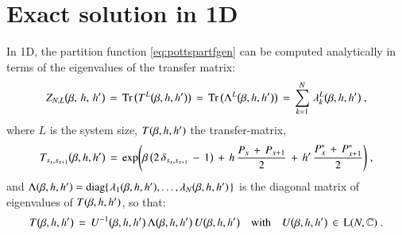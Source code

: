 \documentclass[epj]{webofc}
\let\originalleft\left
\let\originalright\right
\renewcommand{\left}{\mathopen{}\mathclose\bgroup\originalleft}
\renewcommand{\right}{\aftergroup\egroup\originalright}
\newcommand{\of}[1]{\left(#1\right)}
\newcommand{\sof}[1]{\bigl(\big.#1\big.\bigr)}
\newcommand{\cof}[1]{\left\{\right.#1\left.\right\}}
\newcommand{\diag}{\operatorname{diag}}
\newcommand{\sTrace}[1]{\operatorname{Tr}\big(#1\big)}
\newcommand{\op}[1]{\operatorname{#1}}
\renewcommand*\[{\begin{equation}}
\renewcommand*\]{\end{equation}}
\begin{document}
\section{Exact solution in 1D}\label{sec:exactsol}
In 1D, the partition function \eqref{eq:pottspartfgen} can be computed analytically in terms of the eigenvalues of the transfer matrix:
\[
Z_{N,L}\of{\beta,\,h,\,h'}\,=\,\sTrace{T^{L}\of{\beta,h,h'}}\,=\,\sTrace{\Lambda^{L}\of{\beta,h,h'}}\,=\,\sum\limits_{k=1}^{N}\,\lambda_{k}^{L}\of{\beta,h,h'}\ ,\label{eq:partf1d}
\]
where $L$ is the system size, $T\of{\beta,h,h'}$ the transfer-matrix,
\[
T_{s_{x},s_{x+1}}\of{\beta,h,h'}\,=\,\exp\of{\beta\,\sof{2\,\delta_{s_{x},s_{x+1}}\,-\,1}\,+\,h\,\frac{P_{x}\,+\,P_{x+1}}{2}\,+\,h'\,\frac{P^{*}_{x}\,+\,P^{*}_{x+1}}{2}}\ ,
\]
and $\Lambda\of{\beta,h,h'}=\diag\cof{\lambda_{1}\of{\beta,h,h'},\ldots,\lambda_{N}\of{\beta,h,h'}}$ is the diagonal matrix of eigenvalues of $T\of{\beta,h,h'}$, so that:
\[
T\of{\beta,h,h'}\,=\,U^{-1}\of{\beta,h,h'}\,\Lambda\of{\beta,h,h'}\,U\of{\beta,h,h'}\quad\text{with}\quad U\of{\beta,h,h'}\,\in\,\op{L}\of{N,\mathbb{C}}\ .
\]
\end{document}
